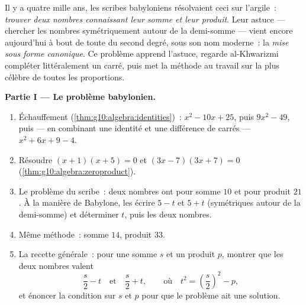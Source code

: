\begin{problem}[{Devoir du week-end --- problèmes somme-produit,
la mise sous forme canonique telle qu'al-Khwarizmi la dessinait, et
l'équation $x^2 = x + 1$}]
\label{pb:g10:algebra:1}
Il y a quatre mille ans, les scribes babyloniens résolvaient ceci sur
l'argile~: \emph{trouver deux nombres connaissant leur somme et leur
produit}. Leur astuce --- chercher les nombres symétriquement autour
de la demi-somme --- vient encore aujourd'hui à bout de toute 
du second degré, sous son nom moderne~: la \emph{mise sous forme
canonique}. Ce problème apprend l'astuce, regarde al-Khwarizmi
compléter littéralement un carré, puis met la méthode au travail sur
la plus célèbre de toutes les proportions.

\medskip
\noindent\textbf{Partie I --- Le problème babylonien.}
\begin{enumerate}
  \item Échauffement (\cref{thm:g10:algebra:identities})~: 
        $x^2 - 10x + 25$, puis $9x^2 - 49$, puis --- en combinant une
        identité et une différence de carrés --- $x^2 + 6x + 9 - 4$.
  \item Résoudre $(x + 1)(x + 5) = 0$ et $(3x - 7)(3x + 7) = 0$
        (\cref{thm:g10:algebra:zeroproduct}).
  \item Le problème du scribe~: deux nombres ont pour somme $10$ et
        pour produit $21$. À la manière de Babylone, les écrire
        $5 - t$ et $5 + t$ (symétriques autour de la demi-somme) et
        déterminer $t$, puis les deux nombres.
  \item Même méthode~: somme $14$, produit $33$.
  \item La recette générale~: pour une somme $s$ et un produit $p$,
        montrer que les deux nombres valent
        \[
        \frac s2 - t
        \quad\text{et}\quad
        \frac s2 + t,
        \qquad\text{où}\quad
        t^2 = \left(\frac s2\right)^2 - p ,
        \]
        et énoncer la condition sur $s$ et $p$ pour que le problème
        ait une solution.
\end{enumerate}


\end{problem}
